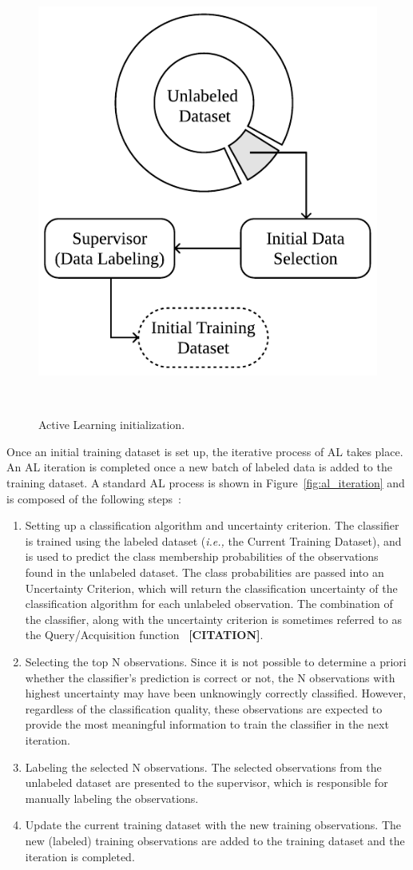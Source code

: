 \documentclass[parskip=full]{scrartcl}
\begin{document}
\begin{figure}[H]
	\centering
	\includegraphics[width=.4\linewidth]{../analysis/al_initialization}
    \caption{%
        Active Learning initialization.
    }~\label{fig:al_initialization}
\end{figure}

Once an initial training dataset is set up, the iterative process of AL takes
place. An AL iteration is completed once a new batch of labeled data is added
to the training dataset. A standard AL process is shown in
Figure~\ref{fig:al_iteration} and is composed of the following
steps~\cite{Su2020, Sverchkov2017}:

\begin{enumerate}

    \item Setting up a classification algorithm and uncertainty criterion. The
        classifier is trained using the labeled dataset (\textit{i.e.,} the
        Current Training Dataset), and is used to predict the class membership
        probabilities of the observations found in the unlabeled dataset. The
        class probabilities are passed into an Uncertainty Criterion, which
        will return the classification uncertainty of the classification
        algorithm for each unlabeled observation. The combination of the
        classifier, along with the uncertainty criterion is sometimes referred
        to as the Query/Acquisition function~\cite{Rosario2020} \textbf{[CITATION]}.

    \item Selecting the top N observations. Since it is not possible to
        determine a priori whether the classifier's prediction is correct or
        not, the N observations with highest uncertainty may have been
        unknowingly correctly classified. However, regardless of the
        classification quality, these observations are expected to provide the
        most meaningful information to train the classifier in the next
        iteration.

    \item Labeling the selected N observations. The selected observations from
        the unlabeled dataset are presented to the supervisor, which is
        responsible for manually labeling the observations.

    \item Update the current training dataset with the new training
        observations. The new (labeled) training observations are added to the
        training dataset and the iteration is completed.

\end{enumerate}
\end{document}
